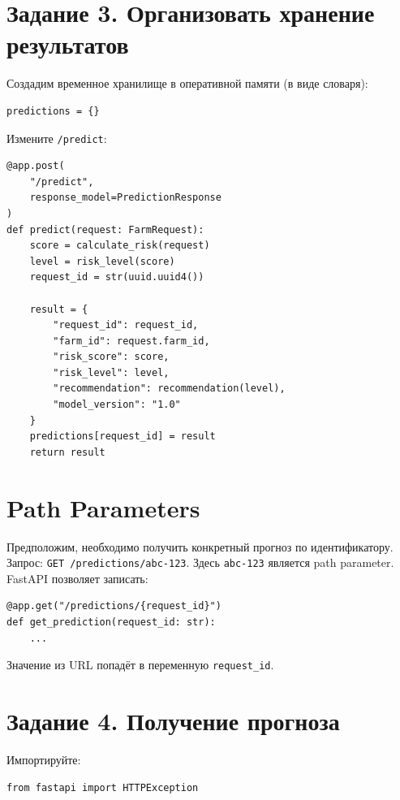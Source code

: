 \documentclass[12pt,a4paper]{article}
\begin{document}
\section{Задание 3. Организовать хранение результатов}

Создадим временное хранилище в оперативной памяти (в виде словаря):

\begin{lstlisting}[caption={Хранилище прогнозов}]
predictions = {}
\end{lstlisting}

Измените \texttt{/predict}:

\begin{lstlisting}[caption={/predict с сохранением результата}]
@app.post(
    "/predict",
    response_model=PredictionResponse
)
def predict(request: FarmRequest):
    score = calculate_risk(request)
    level = risk_level(score)
    request_id = str(uuid.uuid4())

    result = {
        "request_id": request_id,
        "farm_id": request.farm_id,
        "risk_score": score,
        "risk_level": level,
        "recommendation": recommendation(level),
        "model_version": "1.0"
    }
    predictions[request_id] = result
    return result
\end{lstlisting}

\section{Path Parameters}

Предположим, необходимо получить конкретный прогноз по идентификатору. Запрос: \texttt{GET /predictions/abc-123}. Здесь \texttt{abc-123} является path parameter. FastAPI позволяет записать:

\begin{lstlisting}[caption={Path parameter}]
@app.get("/predictions/{request_id}")
def get_prediction(request_id: str):
    ...
\end{lstlisting}

Значение из URL попадёт в переменную \texttt{request\_id}.

\section{Задание 4. Получение прогноза}

Импортируйте:

\begin{lstlisting}[caption={Импорт HTTPException}]
from fastapi import HTTPException
\end{lstlisting}
\end{document}
